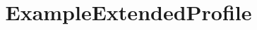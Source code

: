 \documentclass{test}
\begin{document}
\title{ExampleExtendedProfile} \maketitle \noindent




\end{document}
